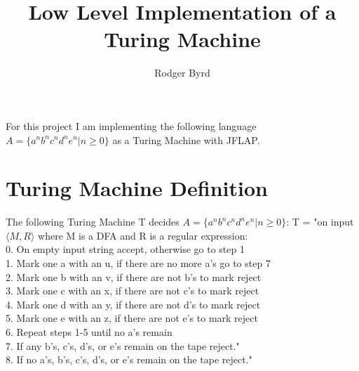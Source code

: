 \documentclass{article}
\begin{document}
\raggedright
\doublespacing

\title{Low Level Implementation of a Turing Machine}
\author{Rodger Byrd}
\maketitle
For this project I am implementing the following language $A=\{a^{n}b^{n}c^{n}d^{n}e^{n} \vert n \geq 0\}$ as a Turing Machine with JFLAP\cite{jflap}.

\section{Turing Machine Definition}
The following Turing Machine T decides $A=\{a^{n}b^{n}c^{n}d^{n}e^{n} \vert n \geq 0\}$:\break
T = "on input $\langle M,R\rangle$ where M is a DFA and R is a regular expression:\\
\hspace{20 pt} 0. On empty input string accept, otherwise go to step 1\\
\hspace{20 pt} 1. Mark one a with an u, if there are no more a's go to step 7\\
\hspace{20 pt} 2. Mark one b with an v, if there are not b's to mark reject\\
\hspace{20 pt} 3. Mark one c with an x, if there are not c's to mark reject\\
\hspace{20 pt} 4. Mark one d with an y, if there are not d's to mark reject\\
\hspace{20 pt} 5. Mark one e with an z, if there are not e's to mark reject\\
\hspace{20 pt} 6. Repeat steps 1-5 until no a's remain\\
\hspace{20 pt} 7. If any b's, c's, d's, or e's remain on the tape reject."\\
\hspace{20 pt} 8. If no a's, b's, c's, d's, or e's remain on the tape reject."
\end{document}
